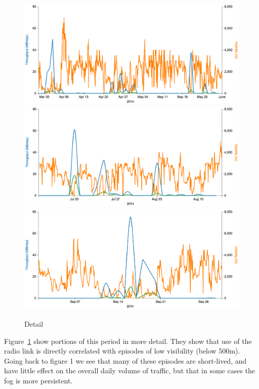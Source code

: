 \documentclass{amsart}
\begin{document}
\begin{figure}
  \centering
  \includegraphics[width=\textwidth]{results/fig3-Wireless-28-March-1-June}
  \includegraphics[width=\textwidth]{results/fig4-Wireless-14-July-14-Aug}
  \includegraphics[width=\textwidth]{results/fig5-Wireless-September}
  \caption{Detail}
  \label{fig:throughput_detail}
\end{figure}
Figure~\ref{fig:throughput_detail} show portions of this period in
more detail. They show that use of the radio link is directly
correlated with episodes of low visibility (below 500m). Going back to
figure 1 we see that many of these episodes are short-lived, and have
little effect on the overall daily volume of traffic, but that in some
cases the fog is more persistent.
\end{document}
